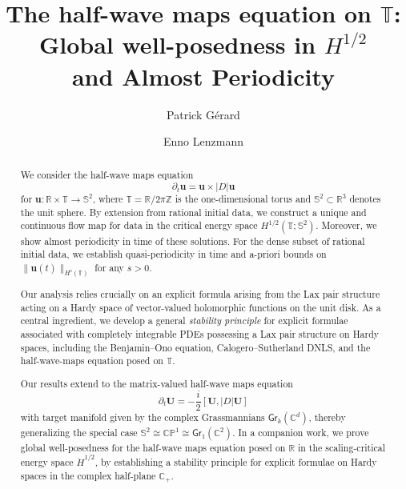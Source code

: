 \documentclass[10pt,reqno,a4paper]{amsart}
\theoremstyle{definition}
\theoremstyle{remark}
\theoremstyle{remark}
\numberwithin{equation}{section}
\newcommand{\C}{\mathbb{C}}
\newcommand{\Z}{\mathbb{Z}}
\newcommand{\R}{\mathbb{R}}
\newcommand{\T}{\mathbb{T}}
\newcommand{\Ss}{\mathbb{S}}
\newcommand{\pt}{\partial}
\newcommand{\uu}{\mathbf{u}}
\newcommand{\Ub}{\mathbf{U}}
\newcommand{\Gr}{\mathsf{Gr}}
\begin{document}
\title[HWM on $\T$: GWP in $H^{1/2}$ and almost periodicity]{The half-wave maps equation on $\T$: \\ Global well-posedness in $H^{1/2}$ \\ and Almost Periodicity}

\author{Patrick G\'erard}
\address{P. G\'erard,  Laboratoire de Math\'ematiques d'Orsay, CNRS, Universit\'e Paris-Saclay, 91405 Orsay, France.}%

\author{Enno Lenzmann}
\address{E. Lenzmann, University of Basel, Department of Mathematics and Computer Science, Spiegelgasse 1, CH-4051 Basel, Switzerland.}%

\maketitle

\begin{abstract}
We consider the half-wave maps equation
\[
\partial_t \uu = \uu \times |D| \uu
\]
for $\uu : \R \times \T \to \Ss^2$, where $\T=\R/2 \pi \Z$ is the one-dimensional torus and $\Ss^2 \subset \R^3$ denotes the unit sphere. By extension from rational initial data, we construct a unique and continuous flow map for data in the critical energy space $H^{1/2}(\T; \Ss^2)$. Moreover, we show almost periodicity in time of these solutions. For the dense subset of rational initial data, we establish quasi-periodicity in time and a-priori bounds on $\| \uu(t) \|_{H^s(\T)}$ for any $s >0$.

Our analysis relies crucially on an explicit formula arising from the Lax pair structure acting on a Hardy space of vector-valued holomorphic functions on the unit disk. As a central ingredient, we develop a general {\em stability principle} for explicit formulae associated with completely integrable PDEs possessing a Lax pair structure on Hardy spaces, including the Benjamin--Ono equation, Calogero--Sutherland DNLS, and the half-wave-maps equation posed on $\T$.

Our results extend to the matrix-valued half-wave maps equation 
$$
\pt_t \Ub = -\frac{i}{2} [ \Ub, |D| \Ub ]
$$
with target manifold given by the complex Grassmannians $\Gr_k(\C^d)$, thereby generalizing the special case $\Ss^2 \cong \mathbb{CP}^1 \cong \Gr_1(\C^2)$. In a companion work, we prove global well-posedness for the half-wave maps equation posed on $\R$ in the scaling-critical energy space $\dot{H}^{1/2}$, by establishing a stability principle for explicit formulae on Hardy spaces in the complex half-plane $\C_+$. 
\end{abstract}
\end{document}
